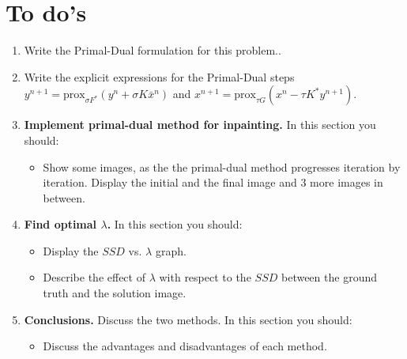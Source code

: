 \documentclass{paper}
\begin{document}
\section{To do's}
\begin{enumerate}
\item Write the Primal-Dual formulation for this problem..

\item Write the explicit expressions for the Primal-Dual steps $y^{n+1} = \text{prox}_{\sigma F^*} (y^n + \sigma K \bar{x}^n)$ and $x^{n+1} = \text{prox}_{\tau G} (x^n  - \tau K^* y^{n+1})$.


\item \textbf{Implement primal-dual method for inpainting.} In this section you should:

\begin{itemize}
\item Show some images, as the the primal-dual method progresses iteration by iteration. Display the initial and the final image and 3 more images in between.
\end{itemize}
\item \textbf{ Find optimal $\lambda$.} In this section you should:

\begin{itemize}
\item Display the $SSD$ vs. $\lambda$ graph.
\item Describe the effect of $\lambda$ with respect to the $SSD$ between the ground truth and the solution image.
\end{itemize}

\item \textbf{ Conclusions.} Discuss the two methods. In this section you should:
\begin{itemize}
\item Discuss the advantages and disadvantages of each method.
\end{itemize}
\end{enumerate}

 
\end{document}
